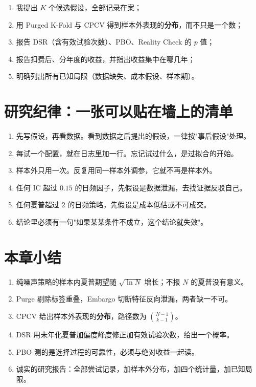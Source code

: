 \begin{keybox}[一份诚实的研究报告应该长什么样]
\begin{enumerate}
  \item 我提出 $K$ 个候选假设，全部记录在案；
  \item 用 Purged K-Fold 与 CPCV 得到样本外表现的\textbf{分布}，而不只是一个数；
  \item 报告 DSR（含有效试验次数）、PBO、Reality Check 的 $p$ 值；
  \item 报告扣费后、分年度的收益，并指出收益集中在哪几年；
  \item 明确列出所有已知局限（数据缺失、成本假设、样本期）。
\end{enumerate}
\end{keybox}

\section{研究纪律：一张可以贴在墙上的清单}

\begin{enumerate}
  \item 先写假设，再看数据。看到数据之后提出的假设，一律按"事后假设"处理。
  \item 每试一个配置，就在日志里加一行。忘记试过什么，是过拟合的开始。
  \item 样本外只用一次。反复用同一样本外调参，它就不再是样本外。
  \item 任何 IC 超过 $0.15$ 的日频因子，先假设是数据泄漏，去找证据反驳自己。
  \item 任何夏普超过 $2$ 的日频策略，先假设是成本低估或不可成交。
  \item 结论里必须有一句"如果某某条件不成立，这个结论就失效"。
\end{enumerate}

\section{本章小结}

\begin{enumerate}
  \item 纯噪声策略的样本内夏普期望随 $\sqrt{\ln N}$ 增长；不报 $N$ 的夏普没有意义。
  \item Purge 剔除标签重叠，Embargo 切断特征反向泄漏，两者缺一不可。
  \item CPCV 给出样本外表现的\textbf{分布}，路径数为 $\binom{N-1}{k-1}$。
  \item DSR 用未年化夏普加偏度峰度修正加有效试验次数，给出一个概率。
  \item PBO 测的是选择过程的可靠性，必须与绝对收益一起读。
  \item 诚实的研究报告：全部尝试记录，加样本外分布，加四个统计量，加已知局限。
\end{enumerate}
